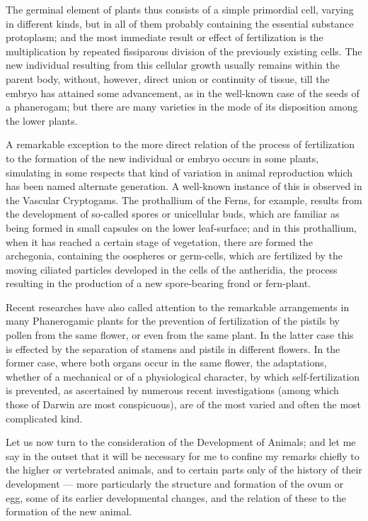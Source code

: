 \documentclass[a4paper, 11pt, oneside, english]{article}
\begin{document}
The germinal element of plants thus consists of a simple primordial cell, varying in different kinds, but in all of them probably containing the essential substance protoplasm; and the most immediate result or effect of fertilization is the multiplication by repeated fissiparous division of the previously existing cells. The new individual resulting from this cellular growth usually remains within the parent body, without, however, direct union or continuity of tissue, till the embryo has attained some advancement, as in the well-known case of the seeds of a phanerogam; but there are many varieties in the mode of its disposition among the lower plants.

A remarkable exception to the more direct relation of the process of fertilization to the formation of the new individual or embryo occurs in some plants, simulating in some respects that kind of variation in animal reproduction which has been named alternate generation. A well-known instance of this is observed in the Vascular Cryptogams. The prothallium of the Ferns, for example, results from the development of so-called spores or unicellular buds, which are familiar as being formed in small capsules on the lower leaf-surface; and in this prothallium, when it has reached a certain stage of vegetation, there are formed the archegonia, containing the oospheres or germ-cells, which are fertilized by the moving ciliated particles developed in the cells of the antheridia, the process resulting in the production of a new spore-bearing frond or fern-plant.

Recent researches have also called attention to the remarkable arrangements in many Phanerogamic plants for the prevention of fertilization of the pistils by pollen from the same flower, or even from the same plant. In the latter case this is effected by the separation of stamens and pistils in different flowers. In the former case, where both organs occur in the same flower, the adaptations, whether of a mechanical or of a physiological character, by which self-fertilization is prevented, as ascertained by numerous recent investigations (among which those of Darwin are most conspicuous), are of the most varied and often the most complicated kind.

Let us now turn to the consideration of the Development of Animals; and let me say in the outset that it will be necessary for me to confine my remarks chiefly to the higher or vertebrated animals, and to certain parts only of the history of their development --- more particularly the structure and formation of the ovum or egg, some of its earlier developmental changes, and the relation of these to the formation of the new animal.
\end{document}

